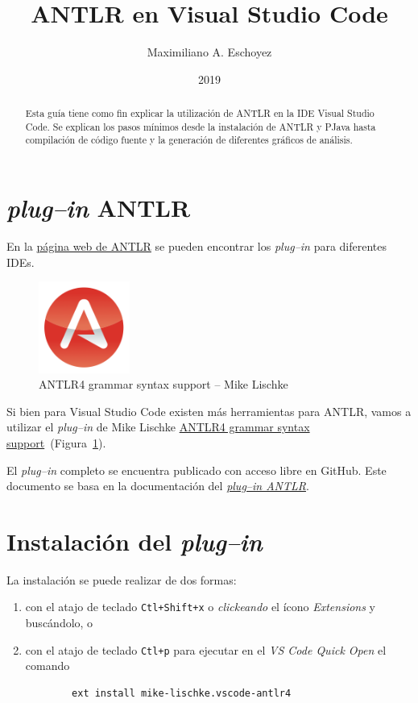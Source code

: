 \documentclass[a5paper,10pt]{article}
\author{Maximiliano A. Eschoyez}
\title{ANTLR en Visual Studio Code}
\date{2019}
\begin{document}
\maketitle

\begin{abstract}
	Esta guía tiene como fin explicar la utilización de ANTLR en la IDE Visual Studio Code.  Se explican los pasos mínimos desde la instalación de ANTLR y PJava hasta compilación de código fuente y la generación de diferentes gráficos de análisis.
\end{abstract}

\section{\emph{plug--in} ANTLR}
\label{intro}

En la \href{https://www.antlr.org/tools.html}{página web de ANTLR} se pueden encontrar los \emph{plug--in} para diferentes IDEs.

\begin{figure}[b]
	\centering
	\includegraphics[width=3cm]{IconoANTLRvscode}
	\caption{ANTLR4 grammar syntax support -- Mike Lischke}
	\label{icono}
\end{figure}

Si bien para Visual Studio Code existen más herramientas para ANTLR, vamos a utilizar el \emph{plug--in} de Mike Lischke \href{https://marketplace.visualstudio.com/items?itemName=mike-lischke.vscode-antlr4}{ANTLR4 grammar syntax support}~(Figura~\ref{icono}).

El \emph{plug--in} completo se encuentra publicado con acceso libre en GitHub.  Este documento se basa en la documentación del \href{https://github.com/mike-lischke/vscode-antlr4/tree/master/doc}{\emph{plug--in ANTLR}}.



\section{Instalación del \emph{plug--in}}
\label{instalacion}

La instalación se puede realizar de dos formas:
\begin{enumerate}
	\item con el atajo de teclado \verb|Ctl+Shift+x| o \emph{clickeando} el ícono \emph{Extensions} y buscándolo, o
    \item con el atajo de teclado \verb|Ctl+p| para ejecutar en el \emph{VS Code Quick Open} el comando
    \begin{verbatim}
		ext install mike-lischke.vscode-antlr4
	\end{verbatim}
\end{enumerate}
\end{document}
